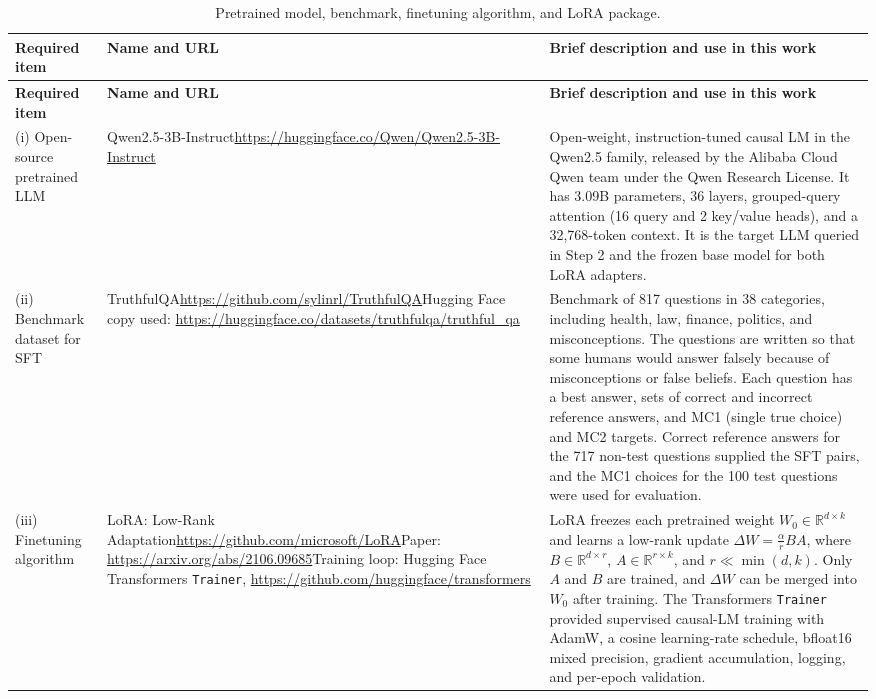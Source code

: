 \documentclass[11pt]{article}
\begin{document}
{\small
\begin{longtable}{|p{}|p{}|p{}|}
  \caption{Pretrained model, benchmark, finetuning algorithm, and LoRA package.}\label{tab:packages}\\
  \hline
  \textbf{Required item} & \textbf{Name and URL} & \textbf{Brief description and use in this work} \\ \hline
  \endfirsthead
  \hline
  \textbf{Required item} & \textbf{Name and URL} & \textbf{Brief description and use in this work} \\ \hline
  \endhead
  (i) Open-source pretrained LLM &
  Qwen2.5-3B-Instruct\newline \url{https://huggingface.co/Qwen/Qwen2.5-3B-Instruct} &
  Open-weight, instruction-tuned causal LM in the Qwen2.5 family, released by the Alibaba Cloud Qwen team under the Qwen Research License. It has 3.09B parameters, 36 layers, grouped-query attention (16 query and 2 key/value heads), and a 32,768-token context. It is the target LLM queried in Step 2 and the frozen base model for both LoRA adapters. \\ \hline
  (ii) Benchmark dataset for SFT &
  TruthfulQA\newline \url{https://github.com/sylinrl/TruthfulQA}\newline Hugging Face copy used: \url{https://huggingface.co/datasets/truthfulqa/truthful_qa} &
  Benchmark of 817 questions in 38 categories, including health, law, finance, politics, and misconceptions. The questions are written so that some humans would answer falsely because of misconceptions or false beliefs. Each question has a best answer, sets of correct and incorrect reference answers, and MC1 (single true choice) and MC2 targets. Correct reference answers for the 717 non-test questions supplied the SFT pairs, and the MC1 choices for the 100 test questions were used for evaluation. \\ \hline
  (iii) Finetuning algorithm &
  LoRA: Low-Rank Adaptation\newline \url{https://github.com/microsoft/LoRA}\newline Paper: \url{https://arxiv.org/abs/2106.09685}\newline Training loop: Hugging Face Transformers \texttt{Trainer}, \url{https://github.com/huggingface/transformers} &
  LoRA freezes each pretrained weight $W_0 \in \mathbb{R}^{d\times k}$ and learns a low-rank update $\Delta W = \frac{\alpha}{r} BA$, where $B \in \mathbb{R}^{d\times r}$, $A \in \mathbb{R}^{r\times k}$, and $r \ll \min(d,k)$. Only $A$ and $B$ are trained, and $\Delta W$ can be merged into $W_0$ after training. The Transformers \texttt{Trainer} provided supervised causal-LM training with AdamW, a cosine learning-rate schedule, bfloat16 mixed precision, gradient accumulation, logging, and per-epoch validation. \\ \hline

\end{longtable}}
\end{document}
